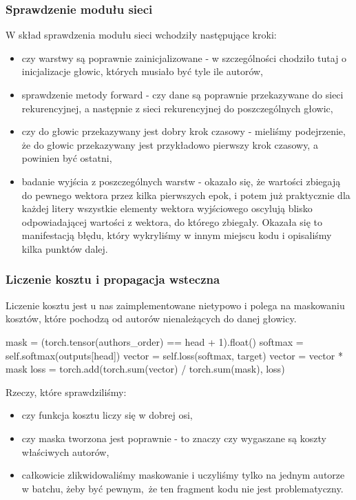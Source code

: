 \subsubsection{Sprawdzenie modułu sieci}
W skład sprawdzenia modułu sieci wchodziły następujące kroki:
	\begin{itemize}
	  \item {czy warstwy są poprawnie zainicjalizowane - w szczególności chodziło tutaj o inicjalizacje głowic,
	  których musiało być tyle ile autorów,}
	  \item {sprawdzenie metody forward - czy dane są poprawnie przekazywane do sieci rekurencyjnej, a następnie
	  z sieci rekurencyjnej do poszczególnych głowic,}
	  \item {czy do głowic przekazywany jest dobry krok czasowy - mieliśmy podejrzenie, że do głowic przekazywany jest przykładowo
	  pierwszy krok czasowy, a powinien być ostatni,}
	  \item {badanie wyjścia z poszczególnych warstw - okazało się, że wartości zbiegają do pewnego wektora przez kilka pierwszych epok,
	  i potem już praktycznie dla każdej litery wszystkie elementy wektora wyjściowego oscylują blisko odpowiadającej wartości z  wektora,
	  do którego zbiegały. Okazała się to manifestacją błędu, który wykryliśmy w innym miejscu kodu i opisaliśmy kilka punktów dalej.}
	\end{itemize}

\subsubsection{Liczenie kosztu i propagacja wsteczna}
Liczenie kosztu jest u nas zaimplementowane nietypowo i polega na maskowaniu kosztów, które pochodzą od autorów
nienależących do danej głowicy.
\begin{python}
mask = (torch.tensor(authors_order) == head + 1).float()
softmax = self.softmax(outputs[head])
vector = self.loss(softmax, target)
vector = vector * mask
loss = torch.add(torch.sum(vector) / torch.sum(mask), loss)

\end{python}
Rzeczy, które sprawdziliśmy:
\begin{itemize}
	  \item {czy funkcja kosztu liczy się w dobrej osi,}
	  \item {czy maska tworzona jest poprawnie - to znaczy czy wygaszane są koszty właściwych autorów,}
	  \item {całkowicie zlikwidowaliśmy maskowanie i uczyliśmy tylko na jednym autorze w batchu, żeby być pewnym, że ten fragment
	  kodu nie jest problematyczny.}
\end{itemize}

